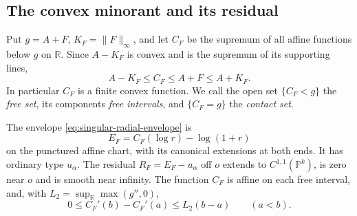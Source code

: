\subsection{The convex minorant and its residual}
Put $g=A+F$, $K_F=\|F\|_\infty$, and let $C_F$ be the supremum of all affine functions below $g$ on $\mathbb R$. Since $A-K_F$ is convex and is the supremum of its supporting lines,
\begin{equation}\label{eq:singular-radial-sandwich}
 A-K_F\leq C_F\leq A+F\leq A+K_F.
\end{equation}
In particular $C_F$ is a finite convex function. We call the open set $\{C_F<g\}$ the \emph{free set}, its components \emph{free intervals}, and $\{C_F=g\}$ the \emph{contact set}.

\begin{theorem}\label{thm:singular-radial-envelope}
The envelope \eqref{eq:singular-radial-envelope} is
\[
 E_F=C_F(\log r)-\log(1+r)
\]
on the punctured affine chart, with its canonical extensions at both ends. It has ordinary type $u_\alpha$. The residual $R_F=E_F-u_\alpha$ off $o$ extends to $C^{1,1}(\mathbb P^k)$, is zero near $o$ and is smooth near infinity. The function $C_F$ is affine on each free interval, and, with $L_2=\sup_{\mathbb R}\max(g'',0)$,
\begin{equation}\label{eq:singular-radial-slope-bound}
 0\leq C_F'(b)-C_F'(a)\leq L_2(b-a)\qquad(a<b).
\end{equation}
\end{theorem}
